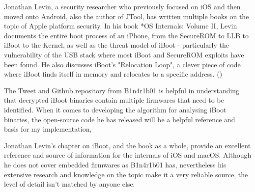 Jonathan Levin, a security researcher who previously focused on iOS and then moved onto Android, also the author of JTool, has written multiple books on the topic of Apple platform security. In his book *OS Internals: Volume II, Levin documents the entire boot process of an iPhone, from the SecureROM to LLB to iBoot to the Kernel, as well as the threat model of iBoot - particularly the vulnerability of the USB stack where most iBoot and SecureROM exploits have been found. He also discusses iBoot's "Relocation Loop", a clever piece of code where iBoot finds itself in memory and relocates to a specific address. (\cite{levin-os-internals-vol2-iboot})


The Tweet and Github repository from B1n4r1b01 is helpful in understanding that decrypted iBoot binaries contain multiple firmwares that need to be identified. When it comes to developing the algorithm for analysing iBoot binaries, the open-source code he has released will be a helpful reference and basis for my implementation,

Jonathan Levin's chapter on iBoot, and the book as a whole, provide an excellent reference and source of information for the internals of iOS and macOS. Although he does not cover embedded firmwares as B1n4r1b01 has, nevertheless his extensive research and knowledge on the topic make it a very reliable source, the level of detail isn't matched by anyone else. 



